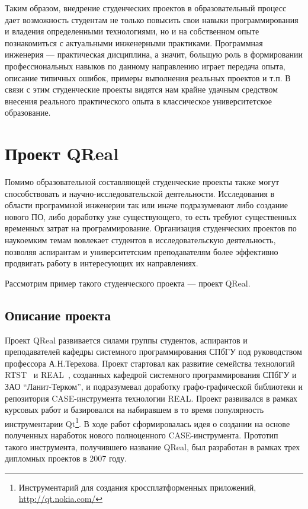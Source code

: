 \documentclass[a4paper]{article}
\begin{document}
Таким образом, внедрение студенческих проектов в образовательный процесс дает возможность студентам не только повысить свои навыки программирования и владения определенными технологиями, но и на собственном опыте познакомиться с актуальными инженерными практиками. Программная инженерия --- практическая дисциплина, а значит, больш\textit{у}ю роль в формировании профессиональных навыков по данному направлению играет передача опыта, описание типичных ошибок, примеры выполнения реальных проектов и т.п. В связи с этим студенческие проекты видятся нам крайне удачным средством внесения реального практического опыта в классическое университетское образование.


\section{Проект QReal}

Помимо образовательной составляющей студенческие проекты также могут способствовать и научно-исследовательской деятельности. Исследования в области программной инженерии так или иначе подразумевают либо создание нового ПО, либо доработку уже существующего, то есть требуют существенных временн\textit{ы}х затрат на программирование. Организация студенческих проектов по наукоемким темам вовлекает студентов в исследовательскую деятельность, позволяя аспирантам и университетским преподавателям более эффективно продвигать работу в интересующих их направлениях.  

Рассмотрим пример такого студенческого проекта --- проект QReal. 

\subsection{Описание проекта}

Проект QReal развивается силами группы студентов, аспирантов и преподавателей кафедры системного программирования СПбГУ под руководством профессора А.Н.Терехова. Проект стартовал как развитие семейства технологий RTST~\cite{rtst} и REAL~\cite{real}, созданных кафедрой системного программирования СПбГУ и ЗАО ``Ланит-Терком'', и подразумевал доработку графо-графической библиотеки и репозитория CASE-инструмента технологии REAL. Проект развивался в рамках курсовых работ и базировался на набиравшем в то время популярность инструментарии Qt\footnote{Инструментарий для создания кроссплатформенных приложений, \url{http://qt.nokia.com/}}. В ходе работ сформировалась идея о создании на основе полученных наработок нового полноценного CASE-инструмента. Прототип такого инструмента, получившего название QReal, был разработан в рамках трех дипломных проектов в 2007 году. 
\end{document}
